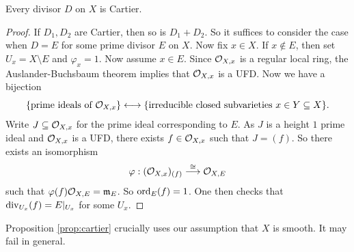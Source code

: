 \begin{prop}\label{prop:cartier}
  Every divisor $D$ on $X$ is Cartier.
\end{prop}

\begin{proof}
  If $D_1, D_2$ are Cartier, then so is
  $D_1 + D_2$. So it suffices to consider
  the case when $D = E$ for some prime
  divisor $E$ on $X$. Now fix $x \in X$.
  If $x \notin E$, then set
  $U_x = X \setminus E$ and $\varphi_x = 1$.
  Now assume $x \in E$. Since
  $\mathcal{O}_{X, x}$ is a regular local ring,
  the Auslander-Buchsbaum theorem
  implies that $\mathcal{O}_{X, x}$ is a UFD.
  Now we have a bijection
  \[
    \{\text{prime ideals of $\mathcal{O}_{X, x}$}\}
    \longleftrightarrow
    \{\text{irreducible closed subvarieties } x \in Y \subseteq X\}.
  \]
  Write $J \subseteq \mathcal{O}_{X, x}$
  for the prime ideal corresponding to $E$.
  As $J$ is a height $1$ prime ideal and
  $\mathcal{O}_{X, x}$ is a UFD, there exists
  $f \in \mathcal{O}_{X, x}$ such that $J = (f)$.
  So there exists an isomorphism
  \[
    \varphi : (\mathcal{O}_{X, x})_{(f)}
    \overset{\cong}{\longrightarrow}
    \mathcal{O}_{X, E}
  \]
  such that $\varphi(f) \mathcal{O}_{X, E} = \mathfrak{m}_E$.
  So $\operatorname{ord}_E(f) = 1$. One then checks that
  $\operatorname{div}_{U_x}(f) = E|_{U_x}$ for some
  $U_x$.
\end{proof}

\begin{remark}
  Proposition \ref{prop:cartier}
  crucially uses our assumption
  that $X$ is smooth. It may fail in
  general.
\end{remark}
